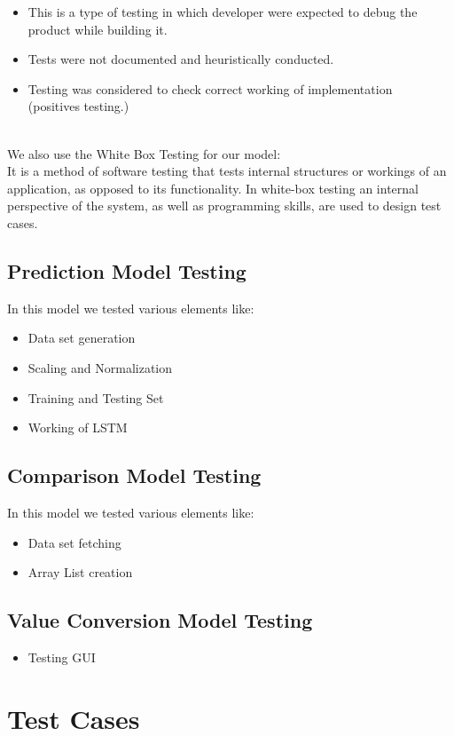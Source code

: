 \documentclass[openany,12pt]{report}
\begin{document}
{{{{{\begin{itemize}
\item{{This is a type of testing in which developer were expected to debug the product while building it.}}
\item{{Tests were not documented and heuristically conducted.}}
\item{{Testing was considered to check correct working of implementation \\(positives testing.)}}
\end{itemize}
\\
We also use the White Box Testing for our model:
\\It is a method of software testing that tests internal structures or workings of an application, as opposed to its functionality. In white-box testing an internal perspective of the system, as well as programming skills, are used to design test cases.

\subsection{Prediction Model Testing}In this model we tested various elements like:
\begin{itemize}

\item{{Data set generation}}
\item{{Scaling and Normalization}}
\item{{Training and Testing Set}}
\item{{Working of LSTM}}
\end{itemize}

\subsection{Comparison Model Testing} In this model we tested various elements like:
\begin{itemize}
\item{{Data set fetching}}
\item{{Array List creation}}
\end{itemize}

\subsection{Value Conversion Model Testing}
\begin{itemize}
\item{{Testing GUI}}
\end{itemize}

\section{Test Cases}

}}}}}
\end{document}
